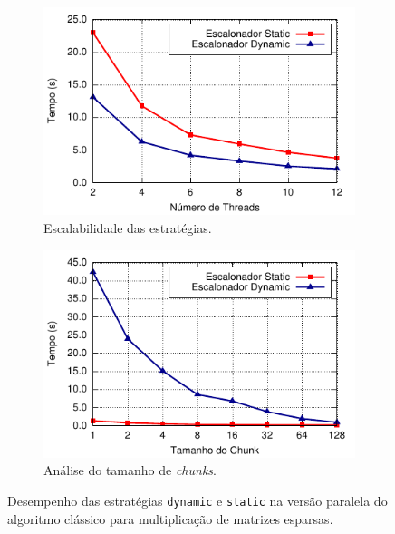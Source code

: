 \documentclass{SBCbookchapter}
\begin{document}
		\begin{figure}[t]
			\captionsetup[subfigure]{justification=centering}
			\centering
				\begin{subfigure}{0.48\linewidth}
					\includegraphics[width=\linewidth]{img/smm}
					\caption{Escalabilidade das estratégias.}
					\label{fig:static-dynamic-guided}
				\end{subfigure}
				\quad
				\begin{subfigure}{0.48\linewidth}
					\includegraphics[width=\linewidth]{img/chunk-size}
					\caption{Análise do tamanho de \textit{chunks}.}
					\label{fig:chunk-size}
				\end{subfigure}
			\caption{Desempenho das estratégias \texttt{dynamic} e
			\texttt{static} na versão paralela do algoritmo clássico para multiplicação de matrizes esparsas.}
		\end{figure}
\end{document}
